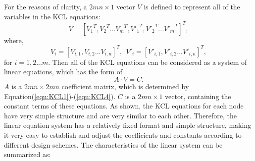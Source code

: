 For the reasons of clarity, a ${2mn\times 1}$ vector ${V}$ is defined to represent all of the variables in the KCL equations:
\begin{equation}\label{equ:V1}
{V}=[{V_1}^T,{V_2}^T...{V_m}^T,{V'_1}^T,{V'_2}^T...{V'_m}^T]^T,
\end{equation}
where,
\begin{equation}\label{equ:V2}
{V_i} = [V_{i,1},V_{i,2}...V_{i,n}]^T,~~{V'_i} = [V'_{i,1},V'_{i,2}...V'_{i,n}]^T,
\end{equation}
for $i=1,2...m$. Then all of the KCL equations can be considered as a system of linear equations, which has the form of
\begin{equation}\label{equ:matrix}
A\cdot V = C.
\end{equation}
$A$ is a ${2mn\times{2mn}}$ coefficient matrix, which is determined by Equation(\ref{equ:KCL1})-(\ref{equ:KCL4}). $C$ is a ${2mn\times{1}}$ vector, containing the constant terms of these equations. As shown, the KCL equations for each node have very simple structure and are very similar to each other. Therefore, the linear equation system has a relatively fixed format and simple structure, making it very easy to establish and adjust the coefficients and constants according to different design schemes. The characteristics of the linear system can be summarized as:

